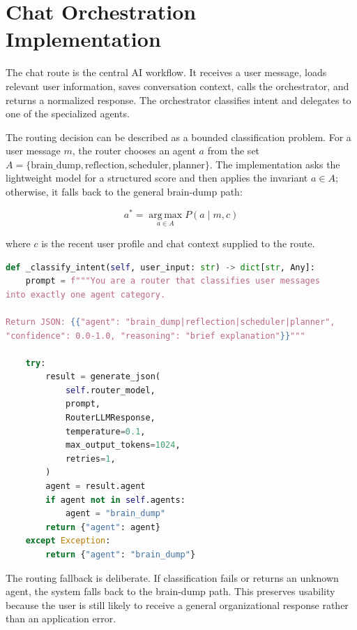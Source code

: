 
\section{Chat Orchestration Implementation}

The chat route is the central AI workflow. It receives a user message, loads relevant user information, saves conversation context, calls the orchestrator, and returns a normalized response. The orchestrator classifies intent and delegates to one of the specialized agents.

The routing decision can be described as a bounded classification problem. For a user message \(m\), the router chooses an agent \(a\) from the set \(A=\{\text{brain\_dump},\text{reflection},\text{scheduler},\text{planner}\}\). The implementation asks the lightweight model for a structured score and then applies the invariant \(a \in A\); otherwise, it falls back to the general brain-dump path:

\[
  a^* = \operatorname*{arg\,max}_{a \in A} P(a \mid m, c)
\]

where \(c\) is the recent user profile and chat context supplied to the route.

\begin{lstlisting}[language=Python,caption={Implemented orchestrator classification and fallback},label={lst:orchestrator}]
def _classify_intent(self, user_input: str) -> dict[str, Any]:
    prompt = f"""You are a router that classifies user messages
into exactly one agent category.

Return JSON: {{"agent": "brain_dump|reflection|scheduler|planner",
"confidence": 0.0-1.0, "reasoning": "brief explanation"}}"""

    try:
        result = generate_json(
            self.router_model,
            prompt,
            RouterLLMResponse,
            temperature=0.1,
            max_output_tokens=1024,
            retries=1,
        )
        agent = result.agent
        if agent not in self.agents:
            agent = "brain_dump"
        return {"agent": agent}
    except Exception:
        return {"agent": "brain_dump"}
\end{lstlisting}

The routing fallback is deliberate. If classification fails or returns an unknown agent, the system falls back to the brain-dump path. This preserves usability because the user is still likely to receive a general organizational response rather than an application error.

